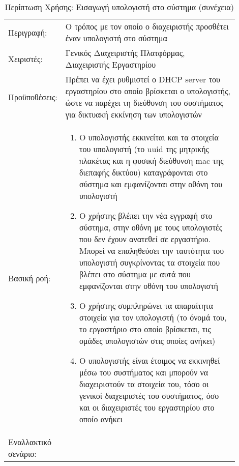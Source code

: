 %
%
\begin{longtable}{|p{0.14\linewidth}|p{0.76\linewidth}|}
	\caption{Περίπτωση Χρήσης: Εισαγωγή υπολογιστή στο σύστημα} \label{tab:use-case-add-computer} \\ \hline \endfirsthead
	\caption[{}]{Περίπτωση Χρήσης: Εισαγωγή υπολογιστή στο σύστημα (συνέχεια)} \\ \endhead \endfoot
	Περιγραφή: & Ο τρόπος με τον οποίο ο διαχειριστής προσθέτει έναν υπολογιστή στο σύστημα \\ \hline
	Χειριστές: & Γενικός Διαχειριστής Πλατφόρμας, Διαχειριστής Εργαστηρίου \\ \hline
	Προϋποθέσεις: & Πρέπει να έχει ρυθμιστεί ο DHCP server του εργαστηρίου στο οποίο βρίσκεται ο υπολογιστής, ώστε να παρέχει τη διεύθυνση του συστήματος για δικτυακή εκκίνηση των υπολογιστών \\ \hline
	Βασική ροή: &
	\begin{enumerate}
		\vspace{-1cm}
		\addtolength{\itemindent}{-0.4cm}
		\item Ο υπολογιστής εκκινείται και τα στοιχεία του υπολογιστή (το uuid της μητρικής πλακέτας και η φυσική διεύθυνση mac της διεπαφής δικτύου) καταγράφονται στο σύστημα και εμφανίζονται στην οθόνη του υπολογιστή
		\item Ο χρήστης βλέπει την νέα εγγραφή στο σύστημα, στην οθόνη με τους υπολογιστές που δεν έχουν ανατεθεί σε εργαστήριο. Μπορεί να επαληθεύσει την ταυτότητα του υπολογιστή συγκρίνοντας τα στοιχεία που βλέπει στο σύστημα με αυτά που εμφανίζονται στην οθόνη του υπολογιστή
		\item Ο χρήστης συμπληρώνει τα απαραίτητα στοιχεία για τον υπολογιστή (το όνομά του, το εργαστήριο στο οποίο βρίσκεται, τις ομάδες υπολογιστών στις οποίες ανήκει)
		\item Ο υπολογιστής είναι έτοιμος να εκκινηθεί μέσω του συστήματος και μπορούν να διαχειριστούν τα στοιχεία του, τόσο οι γενικοί διαχειριστές του συστήματος, όσο και οι διαχειριστές του εργαστηρίου στο οποίο ανήκει
		\vspace{-0.7cm}
	\end{enumerate} \\ \hline
	Εναλλακτικό σενάριο: & \\ \hline
\end{longtable}

